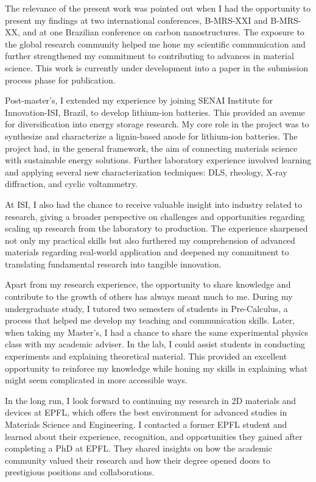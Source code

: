 \documentclass{article}
\begin{document}
The relevance of the present work was pointed out when I had the opportunity to present my findings at two international conferences, B-MRS-XXI and B-MRS-XX, and at one Brazilian conference on carbon nanostructures. The exposure to the global research community helped me hone my scientific communication and further strengthened my commitment to contributing to advances in material science. This work is currently under development into a paper in the submission process phase for publication.

Post-master's, I extended my experience by joining SENAI Institute for Innovation-ISI, Brazil, to develop lithium-ion batteries. This provided an avenue for diversification into energy storage research. My core role in the project was to synthesize and characterize a lignin-based anode for lithium-ion batteries. The project had, in the general framework, the aim of connecting materials science with sustainable energy solutions. Further laboratory experience involved learning and applying several new characterization techniques: DLS, rheology, X-ray diffraction, and cyclic voltammetry.

At ISI, I also had the chance to receive valuable insight into industry related to research, giving a broader perspective on challenges and opportunities regarding scaling up research from the laboratory to production. The experience sharpened not only my practical skills but also furthered my comprehension of advanced materials regarding real-world application and deepened my commitment to translating fundamental research into tangible innovation.

Apart from my research experience, the opportunity to share knowledge and contribute to the growth of others has always meant much to me. During my undergraduate study, I tutored two semesters of students in Pre-Calculus, a process that helped me develop my teaching and communication skills. Later, when taking my Master's, I had a chance to share the same experimental physics class with my academic adviser. In the lab, I could assist students in conducting experiments and explaining theoretical material. This provided an excellent opportunity to reinforce my knowledge while honing my skills in explaining what might seem complicated in more accessible ways.

In the long run, I look forward to continuing my research in 2D materials and devices at EPFL, which offers the best environment for advanced studies in Materials Science and Engineering. I contacted a former EPFL student and learned about their experience, recognition, and opportunities they gained after completing a PhD at EPFL. They shared insights on how the academic community valued their research and how their degree opened doors to prestigious positions and collaborations. 
\end{document}
